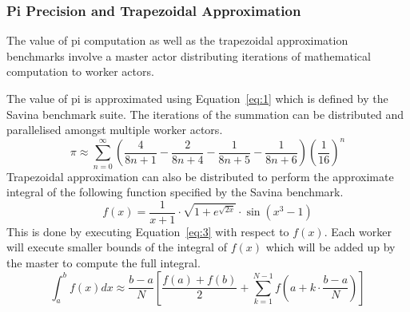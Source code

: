 \documentclass[12pt, a4paper]{report}
\theoremstyle{definition}
\theoremstyle{definition}%
\theoremstyle{definition}%
\theoremstyle{definition}%
\theoremstyle{definition}%
\theoremstyle{definition}%
\begin{document}
\subsubsection{Pi Precision and Trapezoidal Approximation}
The value of pi computation as well as the trapezoidal approximation benchmarks involve a master actor distributing iterations of mathematical computation to worker actors.

The value of pi is approximated using Equation~\ref{eq:1} which is defined by the Savina benchmark suite. The iterations of the summation can be distributed and parallelised amongst multiple worker actors.
\begin{equation} \label{eq:1}
\pi\approx\sum_{n=0}^{\infty}\left(\frac{4}{8n+1}-\frac{2}{8n+4}-\frac{1}{8n+5}-\frac{1}{8n+6}\right) \left(\frac{1}{16} \right)^n
\end{equation}
Trapezoidal approximation can also be distributed to perform the approximate integral of the following function specified by the Savina benchmark.
\begin{equation} \label{eq:2}
f(x)=\frac{1}{x+1}\cdot\sqrt{1+e^{\sqrt{2x}}}\cdot \sin\left(x^3-1\right)
\end{equation}
This is done by executing Equation~\ref{eq:3} with respect to $f(x)$. Each worker will execute smaller bounds of the integral of $f(x)$ which will be added up by the master to compute the full integral.
\begin{equation} \label{eq:3}
\int_{a}^{b}f(x)dx\approx\frac{b-a}{N}\left[ \frac{f(a)+f(b)}{2}+\sum_{k=1}^{N-1}f\left( a+k\cdot\frac{b-a}{N} \right) \right]
\end{equation}
\end{document}
